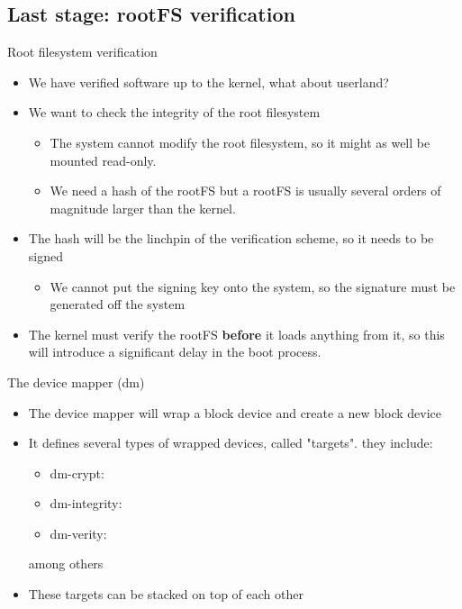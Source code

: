 \subsection{Last stage: rootFS verification}

\begin{frame}{Root filesystem verification}
  \begin{itemize}
    \item We have verified software up to the kernel, what about userland?
    \item We want to check the integrity of the root filesystem
    \begin{itemize}
      \item The system cannot modify the root filesystem, so it might as well
            be mounted read-only.
      \item We need a hash of the rootFS but a rootFS is usually several orders
            of magnitude larger than the kernel.
    \end{itemize}
    \item The hash will be the linchpin of the verification scheme, so it needs to be signed
    \begin{itemize}
      \item We cannot put the signing key onto the system, so the signature
            must be generated off the system
    \end{itemize}
    \item The kernel must verify the rootFS \textbf{before} it loads anything from it,
          so this will introduce a significant delay in the boot process.
  \end{itemize}
\end{frame}

\begin{frame}{The device mapper (dm)}
  \begin{itemize}
    \item The device mapper will wrap a block device and create a new block device
    \item It defines several types of wrapped devices, called "targets". they include:
    \begin{itemize}
      \item dm-crypt: 
      \item dm-integrity: 
      \item dm-verity: 
    \end{itemize}
    among others
    \item These targets can be stacked on top of each other
  \end{itemize}
\end{frame}

